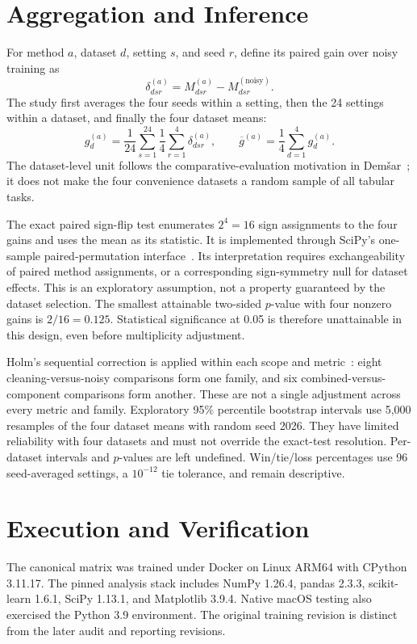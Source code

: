 \section{Aggregation and Inference}
For method $a$, dataset $d$, setting $s$, and seed $r$, define its paired
gain over noisy training as
\begin{equation}
 \delta_{dsr}^{(a)}=M_{dsr}^{(a)}-M_{dsr}^{(\mathrm{noisy})}.
\end{equation}
The study first averages the four seeds within a setting, then the 24
settings within a dataset, and finally the four dataset means:
\begin{equation}
 g_d^{(a)}=\frac1{24}\sum_{s=1}^{24}\frac1{4}\sum_{r=1}^{4}\delta_{dsr}^{(a)},
 \qquad \overline g^{(a)}=\frac1{4}\sum_{d=1}^{4}g_d^{(a)}.
\end{equation}
The dataset-level unit follows the comparative-evaluation motivation in
Dem{\v{s}}ar~\cite{demsar2006}; it does not make the four convenience datasets
a random sample of all tabular tasks.

The exact paired sign-flip test enumerates $2^4=16$ sign assignments to the
four gains and uses the mean as its statistic. It is implemented through
SciPy's one-sample paired-permutation interface~\cite{scipyPermutation}.
Its interpretation requires exchangeability of paired method assignments,
or a corresponding sign-symmetry null for dataset effects. This is an
exploratory assumption, not a property guaranteed by the dataset selection.
The smallest attainable two-sided $p$-value with four nonzero gains is
$2/16=0.125$. Statistical significance at 0.05 is therefore unattainable
in this design, even before multiplicity adjustment.

Holm's sequential correction is applied within each scope and
metric~\cite{holm1979}: eight cleaning-versus-noisy comparisons form one
family, and six combined-versus-component comparisons form another.
These are not a single adjustment across every metric and family. Exploratory
95\% percentile bootstrap intervals use 5,000 resamples of the four dataset
means with random seed 2026. They have limited reliability with four datasets
and must not override the exact-test resolution. Per-dataset intervals and
$p$-values are left undefined. Win/tie/loss percentages use 96 seed-averaged
settings, a $10^{-12}$ tie tolerance, and remain descriptive.

\section{Execution and Verification}
The canonical matrix was trained under Docker on Linux ARM64 with CPython
3.11.17. The pinned analysis stack includes NumPy 1.26.4, pandas 2.3.3,
scikit-learn 1.6.1, SciPy 1.13.1, and Matplotlib 3.9.4. Native macOS testing
also exercised the Python 3.9 environment. The original training revision is
distinct from the later audit and reporting revisions.

